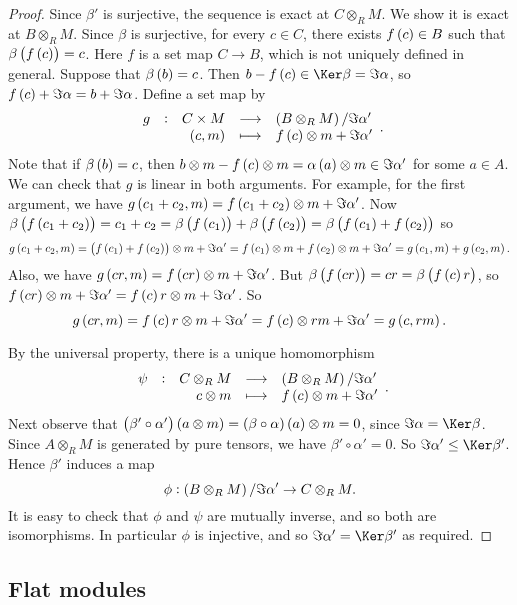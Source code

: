 \begin{proof}
Since $ \beta' $ is surjective, the sequence is exact at $ C \otimes_R M $. We show it is exact at $ B \otimes_R M $. Since $ \beta $ is surjective, for every $ c \in C $, there exists $ f\br{c} \in B $ such that $ \beta\br{f\br{c}} = c $. Here $ f $ is a set map $ C \to B $, which is not uniquely defined in general. Suppose that $ \beta\br{b} = c $. Then $ b - f\br{c} \in \Ker \beta = \Im \alpha $, so $ f\br{c} + \Im \alpha = b + \Im \alpha $. Define a set map by
$$ \function[g]{C \times M}{\br{B \otimes_R M} / \Im \alpha'}{\br{c, m}}{f\br{c} \otimes m + \Im \alpha'}. $$
Note that if $ \beta\br{b} = c $, then $ b \otimes m - f\br{c} \otimes m = \alpha\br{a} \otimes m \in \Im \alpha' $ for some $ a \in A $. We can check that $ g $ is linear in both arguments. For example, for the first argument, we have $ g\br{c_1 + c_2, m} = f\br{c_1 + c_2} \otimes m + \Im \alpha' $. Now $ \beta\br{f\br{c_1 + c_2}} = c_1 + c_2 = \beta\br{f\br{c_1}} + \beta\br{f\br{c_2}} = \beta\br{f\br{c_1} + f\br{c_2}} $ so
$$ g\br{c_1 + c_2, m} = \br{f\br{c_1} + f\br{c_2}} \otimes m + \Im \alpha' = f\br{c_1} \otimes m + f\br{c_2} \otimes m + \Im \alpha' = g\br{c_1, m} + g\br{c_2, m}. $$
Also, we have $ g\br{cr, m} = f\br{cr} \otimes m + \Im \alpha' $. But $ \beta\br{f\br{cr}} = cr = \beta\br{f\br{c}r} $, so $ f\br{cr} \otimes m + \Im \alpha' = f\br{c}r \otimes m + \Im \alpha' $. So
$$ g\br{cr, m} = f\br{c}r \otimes m + \Im \alpha' = f\br{c} \otimes rm + \Im \alpha' = g\br{c, rm}. $$

\pagebreak

By the universal property, there is a unique homomorphism
$$ \function[\psi]{C \otimes_R M}{\br{B \otimes_R M} / \Im \alpha'}{c \otimes m}{f\br{c} \otimes m + \Im \alpha'}. $$
Next observe that $ \br{\beta' \circ \alpha'}\br{a \otimes m} = \br{\beta \circ \alpha}\br{a} \otimes m = 0 $, since $ \Im \alpha = \Ker \beta $. Since $ A \otimes_R M $ is generated by pure tensors, we have $ \beta' \circ \alpha' = 0 $. So $ \Im \alpha' \le \Ker \beta' $. Hence $ \beta' $ induces a map
$$ \phi : \br{B \otimes_R M} / \Im \alpha' \to C \otimes_R M. $$
It is easy to check that $ \phi $ and $ \psi $ are mutually inverse, and so both are isomorphisms. In particular $ \phi $ is injective, and so $ \Im \alpha' = \Ker \beta' $ as required.
\end{proof}

\subsection{Flat modules}

